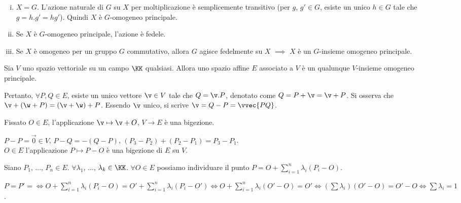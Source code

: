 \documentclass[11pt]{article}
\begin{document}
	\begin{example}
		\begin{enumerate}[(i)]
			\item $X = G$. L'azione naturale di $G$ su $X$ per moltiplicazione
			è semplicemente transitivo (per $g$, $g' \in G$, esiste un
			unico $h \in G$ tale che $g = h.g' = hg'$). Quindi $X$
			è $G$-omogeneo principale.
			
			\item Se $X$ è $G$-omogeneo principale, l'azione è fedele.
			
			\item Se $X$ è omogeneo per un gruppo $G$ commutativo, allora
			$G$ agisce fedelmente su $X$ $\implies$ $X$ è un $G$-insieme
			omogeneo principale.
		\end{enumerate}
	\end{example}

	\begin{definition} 
		Sia $V$ uno spazio vettoriale su un campo $\KK$ qualsiasi.
		Allora uno spazio affine $E$ associato a $V$ è un qualunque
		$V$-insieme omogeneo principale.
	\end{definition}

	Pertanto, $\forall P, Q \in E$, esiste un unico vettore $\v \in V$
	tale che $Q = \v . P $, denotato come $Q = P + \v = \v + P$. Si
	osserva che $\v + (\w + P) = (\v + \w) + P$. Essendo $\v$ unico,
	si scrive $\v = Q - P = \vvec{PQ}$.
	
	
	Fissato $O \in E$, l'applicazione $\v \mapsto \v + O$, $V \to E$
	è una bigezione.
	
	\begin{remark}\nl
		\li $P-P = \vec 0 \in V$, $P-Q = -(Q-P)$, $(P_3 - P_2) + (P_2 - P_1) = P_3 - P_1$. \\
		
		\li $O \in E$ l'applicazione $P \mapsto P-O$ è una bigezione di $E$
		su $V$.
	\end{remark}

	Siano $P_1$, ..., $P_n \in E$. $\forall \lambda_1$, ..., $\lambda_k \in \KK$. $\forall O \in E$ possiamo individuare il punto $P = O + \sum_{i=1}^n \lambda_i (P_i - O)$.
	
	$P = P' = \iff O + \sum_{i=1}^n \lambda_i (P_i - O) = O' + \sum_{i=1}^n \lambda_i (P_i - O') \iff O + \sum_{i=1}^n \lambda_i (O' - O) = O' \iff
	(\sum \lambda_i) (O' - O) = O' - O \iff \sum \lambda_i = 1$.
	
\end{document}
